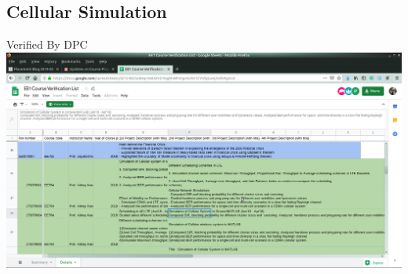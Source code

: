 \documentclass{article}
\begin{document}
	\subsection{Cellular Simulation}
		Verified By DPC\\
		\includegraphics[page=1, scale=0.25]{proofs/wireless.png}
\end{document}
